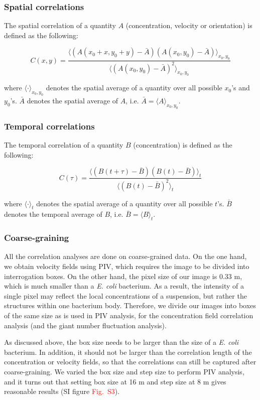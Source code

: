 \documentclass[twocolumn,aps,pre,amsmath,amssymb,longbibliography]{revtex4-1}
\begin{document}
\subsubsection{Spatial correlations}

The spatial correlation of a quantity $A$ (concentration, velocity or orientation) is defined as the following:

$$ C(x, y) = \frac{\langle(A(x_0+x, y_0+y)-\bar A)(A(x_0, y_0)-\bar A) \rangle_{x_0, y_0}}{\langle(A(x_0, y_0)-\bar A)^2\rangle_{x_0, y_0}}$$

where $\langle\cdot\rangle_{x_0, y_0}$ denotes the spatial average of a quantity over all possible $x_0$'s and $y_0$'s.  $\bar A$ denotes the spatial average of $A$, i.e. $\bar A=\langle A\rangle_{x_0, y_0}$.

\subsubsection{Temporal correlations}
The temporal correlation of a quantity $B$ (concentration) is defined as the following:

$$ C(\tau) = \frac{\langle (B(t+\tau)-\bar B)(B(t)-\bar B)\rangle_t}{\langle(B(t)-\bar B)^2\rangle_t} $$

where $\langle\cdot\rangle_{t}$ denotes the spatial average of a quantity over all possible $t$'s.  $\bar B$ denotes the temporal average of $B$, i.e. $\bar B=\langle B\rangle_{t}$.

\subsubsection{Coarse-graining}
All the correlation analyses are done on coarse-grained data. On the one hand, we obtain velocity fields using PIV, which requires the image to be divided into interrogation boxes. On the other hand, the pixel size of our image is 0.33 \textmu m, which is much smaller than a \textit{E. coli} bacterium. As a result, the intensity of a single pixel may reflect the local concentrations of a suspension, but rather the structures within one bacterium body. Therefore, we divide our images into boxes of the same size as is used in PIV analysis, for the concentration field correlation analysis (and the giant number fluctuation analysis).

As discussed above, the box size needs to be larger than the size of a \textit{E. coli} bacterium. In addition, it should not be larger than the correlation length of the concentration or velocity fields, so that the correlations can still be captured after coarse-graining. We varied the box size and step size to perform PIV analysis, and it turns out that setting box size at 16 \textmu m and step size at 8 \textmu m gives reasonable results (SI figure \textcolor{red}{Fig.~S3}).
\end{document}
